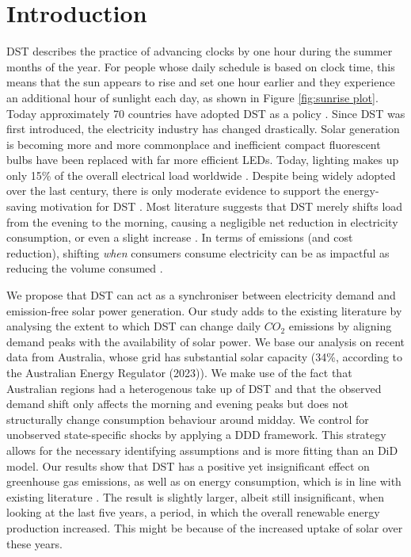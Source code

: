 
\section{Introduction}
\ac{DST} describes the practice of advancing clocks by one hour during the summer months of the year. For people whose daily schedule is based on clock time, this means that the sun appears to rise and set one hour earlier and they experience an additional hour of sunlight each day, as shown in Figure \ref{fig:sunrise plot}. Today approximately 70 countries have adopted \ac{DST} as a policy \parencite{prerau_book}. Since \ac{DST} was first introduced, the electricity industry has changed drastically. Solar generation is becoming more and more commonplace and inefficient compact fluorescent bulbs have been replaced with far more efficient LEDs. Today, lighting makes up only 15\% of the overall electrical load worldwide \parencite{ec_lighting}. 
Despite being widely adopted over the last century, there is only moderate evidence to support the energy-saving motivation for \ac{DST} \parencite{prerau_book}. Most literature suggests that \ac{DST} merely shifts load from the evening to the morning, causing a negligible net reduction in electricity consumption, or even a slight increase \parencite{kellogg_daylight_2008, aries_effect_2008, guven}.
In terms of emissions (and cost reduction), shifting \textit{when} consumers consume electricity can be as impactful as reducing the volume consumed \parencite{holland_is_2008}.

We propose that \ac{DST} can act as a synchroniser between electricity demand and emission-free solar power generation. Our study adds to the existing literature by analysing the extent to which DST can change daily $CO_2$ emissions by aligning demand peaks with the availability of solar power. We base our analysis on recent data from Australia, whose grid has substantial solar capacity (34\%, according to the Australian Energy Regulator (2023)\nocite{state_of_the_market}). We make use of the fact that Australian regions had a heterogenous take up of \ac{DST} and that the observed demand shift only affects the morning and evening peaks but does not structurally change consumption behaviour around midday. We control for unobserved state-specific shocks by applying a \ac{DDD} framework. This strategy allows for the necessary identifying assumptions and is more fitting than an \ac{DiD} model. Our results show that \ac{DST} has a positive yet insignificant effect on greenhouse gas emissions, as well as on energy consumption, which is in line with existing literature \parencite{kellogg_daylight_2008}. The result is slightly larger, albeit still insignificant, when looking at the last five years, a period, in which the overall renewable energy production increased. This might be because of the increased uptake of solar over these years.